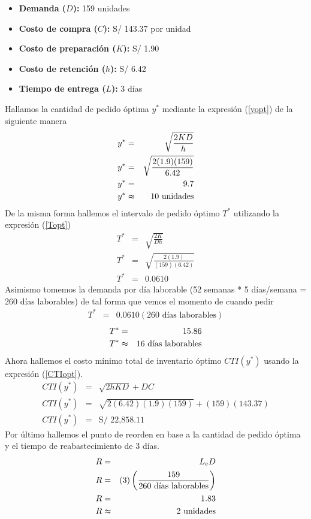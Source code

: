 \begin{itemize}
    \item \textbf{Demanda ($D$):} 159 unidades
    \item \textbf{Costo de compra ($C$):} S/ 143.37 por unidad
    \item \textbf{Costo de preparación ($K$):} S/ 1.90
    \item \textbf{Costo de retención ($h$):} S/ 6.42
    \item \textbf{Tiempo de entrega ($L$):} 3 días
\end{itemize}

Hallamos la cantidad de pedido óptima $y^*$ mediante la expresión (\ref{yopt}) de la siguiente manera
\begin{eqnarray}
    y^* &=& \sqrt{\frac{2KD}{h}} \nonumber \\
    y^* &=& \sqrt{\frac{2(1.9)(159)}{6.42}} \nonumber \\
    y^* &=& 9.7 \nonumber \\
    y^* &\thickapprox& 10 \text{ unidades} \nonumber
\end{eqnarray}
De la misma forma hallemos el intervalo de pedido óptimo $T^*$ utilizando la expresión (\ref{Topt}) 
\begin{eqnarray}
    T^* &=& \sqrt{\frac{2K}{Dh}} \nonumber \\
    T^* &=& \sqrt{\frac{2(1.9)}{(159)(6.42)}} \nonumber \\
    T^* &=& 0.0610 \nonumber
\end{eqnarray}
Asimismo tomemos la demanda por día laborable (52 semanas * 5 días/semana = 260 días laborables) de tal forma que vemos el momento de cuando pedir
\begin{eqnarray}
    T^* &=& 0.0610 (260 \text{ días laborables}) \nonumber
\end{eqnarray}
\begin{eqnarray}
    T^* &=& 15.86 \nonumber \\
    T^* &\thickapprox& 16 \text{ días laborables} \nonumber
\end{eqnarray}
Ahora hallemos el costo mínimo total de inventario óptimo $CTI(y^*)$ usando la expresión (\ref{CTIopt}).
\begin{eqnarray}
    CTI(y^*) &=& \sqrt{2hKD} + DC \nonumber \\
    CTI(y^*) &=& \sqrt{2(6.42)(1.9)(159)} + (159)(143.37) \nonumber \\
    CTI(y^*) &=& \text{S/ 22,858.11} \nonumber
\end{eqnarray}
Por último hallemos el punto de reorden en base a la cantidad de pedido óptima y el tiempo de reabastecimiento de 3 días.
\begin{eqnarray}
    R &=& L_e D \nonumber \\
    R &=& (3) \left(\frac{159}{260 \text{ días laborables}} \right) \nonumber \\
    R &=& 1.83 \nonumber \\
    R &\thickapprox& 2 \text{ unidades} \nonumber
\end{eqnarray}

